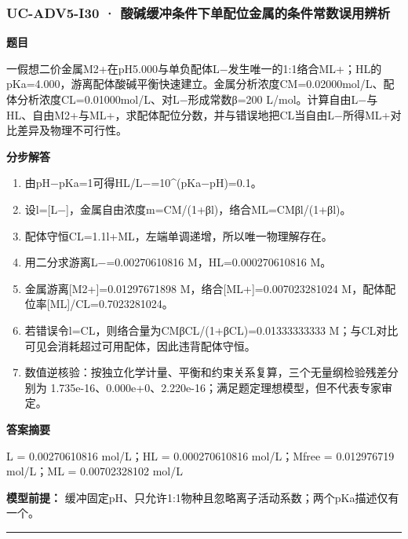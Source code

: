 \documentclass[UTF8,11pt,a4paper]{ctexart}
\begin{document}
\subsubsection*{UC-ADV5-I30 · 酸碱缓冲条件下单配位金属的条件常数误用辨析}
\noindent\textbf{题目}\par
一假想二价金属M2+在pH5.000与单负配体L−发生唯一的1:1络合ML+；HL的pKa=4.000，游离配体酸碱平衡快速建立。金属分析浓度CM=0.02000mol/L、配体分析浓度CL=0.01000mol/L、对L−形成常数β=200 L/mol。计算自由L−与HL、自由M2+与ML+，求配体配位分数，并与错误地把CL当自由L−所得ML+对比差异及物理不可行性。\par
\medskip\noindent\textbf{分步解答}
\begin{enumerate}
\item 由pH−pKa=1可得HL/L−=10\textasciicircum{}(pKa−pH)=0.1。
\item 设l=[L−]，金属自由浓度m=CM/(1+βl)，络合ML=CMβl/(1+βl)。
\item 配体守恒CL=1.1l+ML，左端单调递增，所以唯一物理解存在。
\item 用二分求游离L−=0.00270610816 M，HL=0.000270610816 M。
\item 金属游离[M2+]=0.01297671898 M，络合[ML+]=0.007023281024 M，配体配位率[ML]/CL=0.7023281024。
\item 若错误令l=CL，则络合量为CMβCL/(1+βCL)=0.01333333333 M；与CL对比可见会消耗超过可用配体，因此违背配体守恒。
\item 数值逆核验：按独立化学计量、平衡和约束关系复算，三个无量纲检验残差分别为 1.735e-16、0.000e+0、2.220e-16；满足题定理想模型，但不代表专家审定。
\end{enumerate}
\noindent\textbf{答案摘要}\par
L = 0.00270610816 mol/L；HL = 0.000270610816 mol/L；Mfree = 0.012976719 mol/L；ML = 0.00702328102 mol/L\par
\noindent\textbf{模型前提：}
缓冲固定pH、只允许1:1物种且忽略离子活动系数；两个pKa描述仅有一个。\par
\medskip\hrule\medskip
{}
\end{document}
